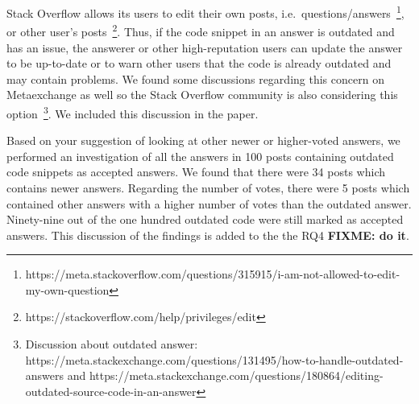 \documentclass[a4paper,twoside,10pt]{reviewresponse}
\newcommand\FIXME[1]{{\color{red}\textbf{FIXME: #1}}}
\begin{document}

Stack Overflow allows its users to edit their own posts, i.e.~questions/answers~\footnote{https://meta.stackoverflow.com/questions/315915/i-am-not-allowed-to-edit-my-own-question}, or other user's posts~\footnote{https://stackoverflow.com/help/privileges/edit}. Thus, if the code snippet in an answer is outdated and has an issue, the answerer or other high-reputation users can update the answer to be up-to-date or to warn other users that the code is already outdated and may contain problems. We found some discussions regarding this concern on Metaexchange as well so the Stack Overflow community is also considering this option~\footnote{Discussion about outdated answer: https://meta.stackexchange.com/questions/131495/how-to-handle-outdated-answers and https://meta.stackexchange.com/questions/180864/editing-outdated-source-code-in-an-answer}. We included this discussion in the paper.

Based on your suggestion of looking at other newer or higher-voted answers, we performed an investigation of all the answers in 100 posts containing outdated code snippets as accepted answers. We found that there were 34 posts which contains newer answers. Regarding the number of votes, there were 5 posts which contained other answers with a higher number of votes than the outdated answer. Ninety-nine out of the one hundred outdated code were still marked as accepted answers. 
This discussion of the findings is added to the the RQ4 \FIXME{do it}.
		
\end{document}
